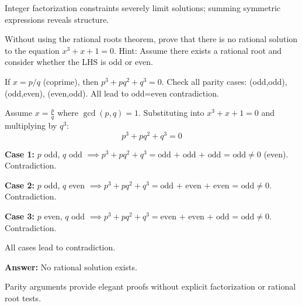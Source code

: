\begin{takeaways}
Integer factorization constraints severely limit solutions; summing symmetric expressions reveals structure.
\end{takeaways}

\vspace{1cm}

\begin{problem}
Without using the rational roots theorem, prove that there is no rational solution to the equation $x^3 + x + 1 = 0$. Hint: Assume there exists a rational root and consider whether the LHS is odd or even.
\end{problem}

\vspace{0.5cm}
\begin{hintbox}
If $x = p/q$ (coprime), then $p^3 + pq^2 + q^3 = 0$. Check all parity cases: (odd,odd), (odd,even), (even,odd). All lead to odd=even contradiction.
\end{hintbox}

\begin{solution}
Assume $x = \frac{p}{q}$ where $\gcd(p,q)=1$. Substituting into $x^3+x+1=0$ and multiplying by $q^3$:
$$
p^3 + pq^2 + q^3 = 0
$$

\textbf{Case 1:} $p$ odd, $q$ odd $\implies p^3 + pq^2 + q^3 = \text{odd + odd + odd = odd} \neq 0$ (even). Contradiction.

\textbf{Case 2:} $p$ odd, $q$ even $\implies p^3 + pq^2 + q^3 = \text{odd + even + even = odd} \neq 0$. Contradiction.

\textbf{Case 3:} $p$ even, $q$ odd $\implies p^3 + pq^2 + q^3 = \text{even + even + odd = odd} \neq 0$. Contradiction.

All cases lead to contradiction.

\textbf{Answer:} No rational solution exists.
\end{solution}

\begin{takeaways}
Parity arguments provide elegant proofs without explicit factorization or rational root tests.
\end{takeaways}

\vspace{1cm}
